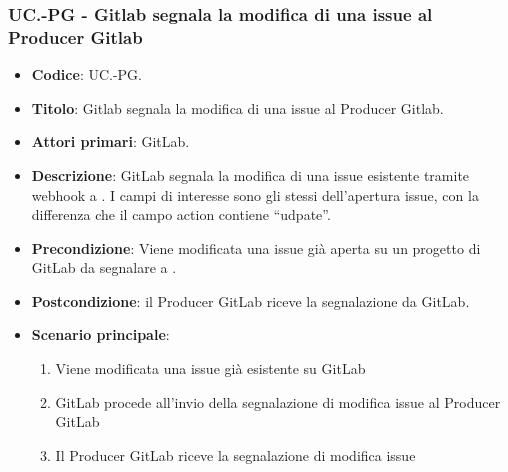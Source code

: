 
\subsubsection{UC\theuccount.\thesubuccount-PG - Gitlab segnala la modifica di una issue al Producer Gitlab}
\begin{itemize}
    \item \textbf{Codice}: UC\theuccount.\thesubuccount-PG.
    \item \textbf{Titolo}: Gitlab segnala la modifica di una issue al Producer Gitlab.
    \item \textbf{Attori primari}: GitLab.
    \item \textbf{Descrizione}: GitLab segnala la modifica di una issue esistente tramite webhook a
    \newline \progetto.
    I campi di interesse sono gli stessi dell'apertura issue, con la differenza che il campo action contiene ``udpate''.
    \item \textbf{Precondizione}: Viene modificata una issue già aperta su un
    progetto di GitLab da segnalare a \progetto.
    \item \textbf{Postcondizione}: il Producer GitLab riceve la segnalazione da GitLab.
    \item \textbf{Scenario principale}: 
    \begin{enumerate}
        \item Viene modificata una issue già esistente su GitLab
        \item GitLab procede all'invio della segnalazione di modifica issue al Producer GitLab
        \item Il Producer GitLab riceve la segnalazione di modifica issue
    \end{enumerate}
    
\end{itemize}


